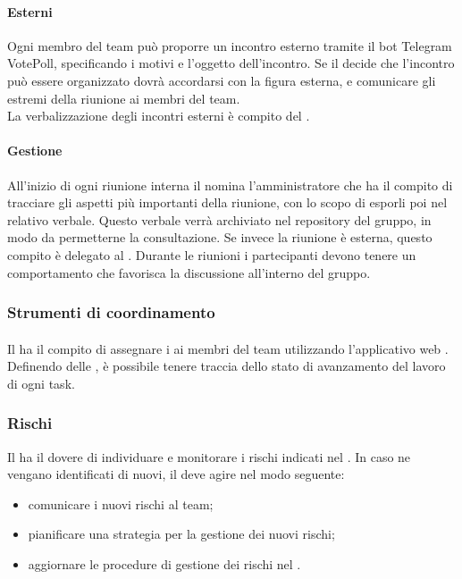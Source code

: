  \paragraph{Esterni} 
 Ogni membro del team può proporre un incontro esterno tramite il bot Telegram VotePoll, specificando i motivi e l'oggetto dell'incontro. 
Se il \RESP{} decide che l'incontro può essere organizzato dovrà accordarsi con la figura esterna, e comunicare gli estremi della riunione ai membri del team.\\
 La verbalizzazione degli incontri esterni è compito del \RESP.
 \paragraph{Gestione}
 All’inizio di ogni riunione interna il \RESP{} nomina l'amministratore che ha il compito di tracciare gli aspetti più importanti della riunione, con lo scopo di esporli poi nel relativo verbale. Questo verbale verrà archiviato nel repository del gruppo, in modo da permetterne la consultazione. Se invece la riunione è esterna, questo compito è delegato al \RESP{}.
 Durante le riunioni i partecipanti devono tenere un comportamento che favorisca la discussione all’interno del gruppo.
 
\subsubsection{Strumenti di coordinamento}
 \paragraph{}
 Il \RESP{} ha il compito di assegnare i  ai membri del team utilizzando l'applicativo web . \\
 Definendo delle , è possibile tenere traccia dello stato di avanzamento del lavoro di ogni task.
 
 \subsubsection{Rischi}
 Il \RESP{} ha il dovere di individuare e monitorare i rischi indicati nel \PPdoc. In caso ne vengano identificati di nuovi, il \RESP{} deve agire nel modo seguente:
 \begin{itemize}
  \item comunicare i nuovi rischi al team;
  \item pianificare una strategia per la gestione dei nuovi rischi;
  \item aggiornare le procedure di gestione dei rischi nel \PPdoc.
 \end{itemize}
